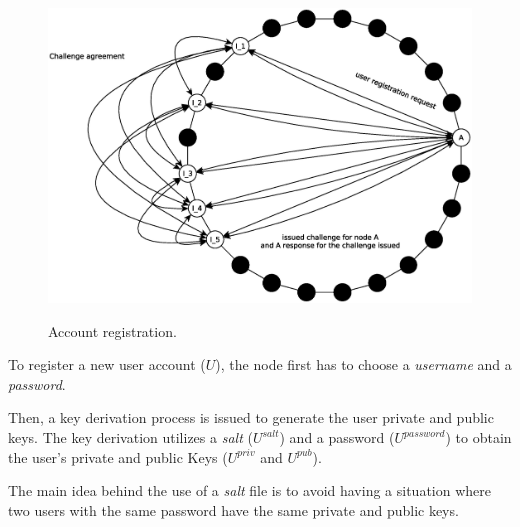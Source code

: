 \begin{figure}[!htb]
\centering
\includegraphics[width=14cm]{../img/sign_up}\\
\caption{Account registration.}
\label{fig:sign_up}
\end{figure}

To register a new user account ($U$), the node first
has to choose a \textit{username} and a \textit{password}.
% 
% 

Then, a key derivation process is issued to generate the user private and
public keys. The
key derivation utilizes a \textit{salt} ($U^{salt}$) and a password ($U^{password}$) to
obtain the user's private and public Keys
($U^{priv}$ and $U^{pub}$).

The main idea behind the use of a \textit{salt} file is to avoid having a
situation where two users with the same password have the same private and
public keys.

